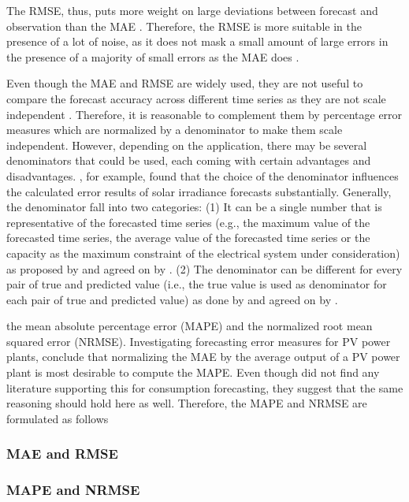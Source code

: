The RMSE, thus, puts more weight on large deviations between forecast and observation than the MAE \citep{Meer:2018}. Therefore, the RMSE is more suitable in the presence of a lot of noise, as it does not mask a small amount of large errors in the presence of a majority of small errors as the MAE does \citep{Zhang:2015}.

Even though the MAE and RMSE are widely used, they are not useful to compare the forecast accuracy across different time series as they are not scale independent \citep{Meer:2018}. Therefore, it is reasonable to complement them by percentage error measures which are normalized by a denominator to make them scale independent. However, depending on the application, there may be several denominators that could be used, each coming with certain advantages and disadvantages. \citet{Hoff:2013}, for example, found that the choice of the denominator influences the calculated error results of solar irradiance forecasts substantially. Generally, the denominator fall into two categories: (1) It can be a single number that is representative of the forecasted time series (e.g., the maximum value of the forecasted time series, the average value of the forecasted time series or the capacity as the maximum constraint of the electrical system under consideration) as proposed by \citet{Hoff:2013} and agreed on by \citet{Meer:2018}. (2) The denominator can be different for every pair of true and predicted value (i.e., the true value is used as denominator for each pair of true and predicted value) as done by \citet{xie:2018} and agreed on by \citet{zor:2017}. 

the mean absolute percentage error (MAPE) and the normalized root mean squared error (NRMSE). Investigating forecasting error measures for PV power plants, \citet{Hoff:2013} conclude that normalizing the MAE by the average output of a PV power plant is most desirable to compute the MAPE. Even though \citet{Meer:2018} did not find any literature supporting this for consumption forecasting, they suggest that the same reasoning should hold here as well. Therefore, the MAPE and NRMSE are formulated as follows

\subsubsection{MAE and RMSE}



\subsubsection{MAPE and NRMSE}

